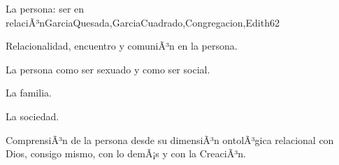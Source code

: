 \begin{syllabus}
\begin{unit}{La persona: ser en relaciÃ³n}{GarciaQuesada,GarciaCuadrado,Congregacion,Edith}{6}{2}
\begin{topics}
 	 	 		\item Relacionalidad, encuentro y comuniÃ³n en la persona.
 	 	 		\item La persona como ser sexuado y como ser social.
 	 	 		\item La familia.
 	 	 		\item La sociedad.
\end{topics}

\begin{unitgoals}
	\item ComprensiÃ³n de la persona desde su dimensiÃ³n ontolÃ³gica relacional con Dios, consigo mismo, con lo demÃ¡s y con la CreaciÃ³n.
\end{unitgoals}
\end{unit}



\begin{coursebibliography}
\end{coursebibliography}

\end{syllabus}
